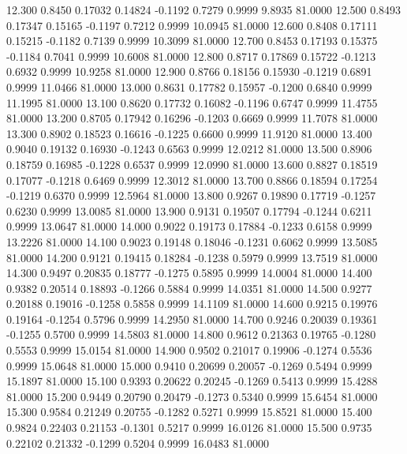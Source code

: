   12.300   0.8450   0.17032   0.14824  -0.1192   0.7279   0.9999   9.8935  81.0000
  12.500   0.8493   0.17347   0.15165  -0.1197   0.7212   0.9999  10.0945  81.0000
  12.600   0.8408   0.17111   0.15215  -0.1182   0.7139   0.9999  10.3099  81.0000
  12.700   0.8453   0.17193   0.15375  -0.1184   0.7041   0.9999  10.6008  81.0000
  12.800   0.8717   0.17869   0.15722  -0.1213   0.6932   0.9999  10.9258  81.0000
  12.900   0.8766   0.18156   0.15930  -0.1219   0.6891   0.9999  11.0466  81.0000
  13.000   0.8631   0.17782   0.15957  -0.1200   0.6840   0.9999  11.1995  81.0000
  13.100   0.8620   0.17732   0.16082  -0.1196   0.6747   0.9999  11.4755  81.0000
  13.200   0.8705   0.17942   0.16296  -0.1203   0.6669   0.9999  11.7078  81.0000
  13.300   0.8902   0.18523   0.16616  -0.1225   0.6600   0.9999  11.9120  81.0000
  13.400   0.9040   0.19132   0.16930  -0.1243   0.6563   0.9999  12.0212  81.0000
  13.500   0.8906   0.18759   0.16985  -0.1228   0.6537   0.9999  12.0990  81.0000
  13.600   0.8827   0.18519   0.17077  -0.1218   0.6469   0.9999  12.3012  81.0000
  13.700   0.8866   0.18594   0.17254  -0.1219   0.6370   0.9999  12.5964  81.0000
  13.800   0.9267   0.19890   0.17719  -0.1257   0.6230   0.9999  13.0085  81.0000
  13.900   0.9131   0.19507   0.17794  -0.1244   0.6211   0.9999  13.0647  81.0000
  14.000   0.9022   0.19173   0.17884  -0.1233   0.6158   0.9999  13.2226  81.0000
  14.100   0.9023   0.19148   0.18046  -0.1231   0.6062   0.9999  13.5085  81.0000
  14.200   0.9121   0.19415   0.18284  -0.1238   0.5979   0.9999  13.7519  81.0000
  14.300   0.9497   0.20835   0.18777  -0.1275   0.5895   0.9999  14.0004  81.0000
  14.400   0.9382   0.20514   0.18893  -0.1266   0.5884   0.9999  14.0351  81.0000
  14.500   0.9277   0.20188   0.19016  -0.1258   0.5858   0.9999  14.1109  81.0000
  14.600   0.9215   0.19976   0.19164  -0.1254   0.5796   0.9999  14.2950  81.0000
  14.700   0.9246   0.20039   0.19361  -0.1255   0.5700   0.9999  14.5803  81.0000
  14.800   0.9612   0.21363   0.19765  -0.1280   0.5553   0.9999  15.0154  81.0000
  14.900   0.9502   0.21017   0.19906  -0.1274   0.5536   0.9999  15.0648  81.0000
  15.000   0.9410   0.20699   0.20057  -0.1269   0.5494   0.9999  15.1897  81.0000
  15.100   0.9393   0.20622   0.20245  -0.1269   0.5413   0.9999  15.4288  81.0000
  15.200   0.9449   0.20790   0.20479  -0.1273   0.5340   0.9999  15.6454  81.0000
  15.300   0.9584   0.21249   0.20755  -0.1282   0.5271   0.9999  15.8521  81.0000
  15.400   0.9824   0.22403   0.21153  -0.1301   0.5217   0.9999  16.0126  81.0000
  15.500   0.9735   0.22102   0.21332  -0.1299   0.5204   0.9999  16.0483  81.0000
